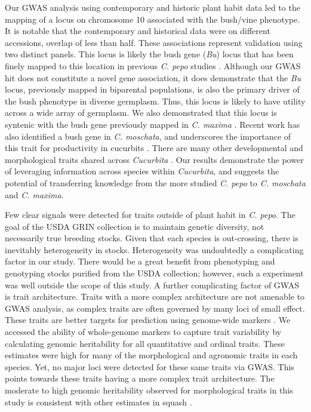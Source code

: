 \documentclass[utf8]{FrontiersinHarvard} %
\begin{document}
Our GWAS analysis using contemporary and historic plant habit data led to the mapping of a locus on chromosome 10 associated with the bush/vine phenotype. It is notable that the contemporary and historical data were on different accessions, overlap of less than half.  These associations represent validation using two distinct panels. This locus is likely the bush gene (\textit{Bu}) locus that has been finely mapped to this location in previous \textit{C. pepo} studies \citep{Xiang2018, Ding2021}. Although our GWAS hit does not constitute a novel gene association, it does demonstrate that the \textit{Bu} locus, previously mapped in biparental populations, is also the primary driver of the bush phenotype in diverse germplasm. Thus, this locus is likely to have utility across a wide array of germplasm. We also demonstrated that this locus is syntenic with the bush gene previously mapped in \textit{C. maxima} \citep{Zhang2015}. Recent work has also identified a bush gene in \textit{C. moschata}, and underscores the importance of this trait for productivity in cucurbits \citep{Wang2022}. There are many other developmental and morphological traits shared across \textit{Cucurbita} \citep{Paris2005}. Our results demonstrate the power of leveraging information across species within \textit{Cucurbita}, and suggests the potential of transferring knowledge from the more studied \textit{C. pepo} to \textit{C. moschata} and \textit{C. maxima}.


Few clear signals were detected for traits outside of plant habit in \textit{C. pepo}. The goal of the USDA GRIN collection is to maintain genetic diversity, not necessarily true breeding stocks. Given that each species is out-crossing, there is inevitably heterogeneity in stocks. Heterogeneity was undoubtedly a complicating factor in our study. There would be a great benefit from phenotyping and genotyping stocks purified from the USDA collection; however, such a experiment was well outside the scope of this study. A further complicating factor of GWAS is trait architecture. {\color{red}Traits with a more complex architecture are not amenable to GWAS analysis, as complex traits are often governed by many loci of small effect. These traits are better targets for prediction using genome-wide markers \citep{Meuwissen2001}.} We accessed the ability of whole-genome markers to capture trait variability by calculating genomic heritability for all quantitative and ordinal traits. These estimates were high for many of the morphological and agronomic traits in each species. Yet, no major loci were detected for these same traits via GWAS. This points towards these traits having a more complex trait architecture. The moderate to high genomic heritability observed for morphological traits in this study is consistent with other estimates in squash \citep{Hernandez2020}.
\end{document}
